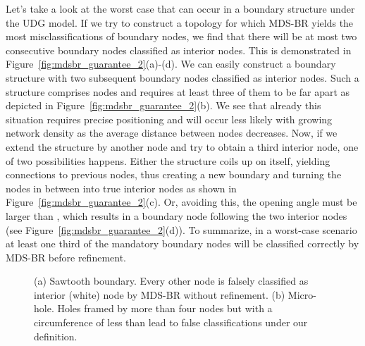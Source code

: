 \documentclass{llncs}
\begin{document}
Let's take a look at the worst case that can occur in a boundary structure under the UDG model.
If we try to construct a topology for which MDS-BR yields the most misclassifications of boundary nodes, we find that there will be at most two consecutive boundary nodes classified as interior nodes.
This is demonstrated in Figure~\ref{fig:mdsbr_guarantee_2}(a)-(d).
We can easily construct a boundary structure with two subsequent boundary nodes classified as interior nodes.
Such a structure comprises  nodes and requires at least three of them to be far apart as depicted in Figure~\ref{fig:mdsbr_guarantee_2}(b).
We see that already this situation requires precise positioning and will occur less likely with growing network density as the average distance between nodes decreases.
Now, if we extend the structure by another node and try to obtain a third interior node, one of two possibilities happens.
Either the structure coils up on itself, yielding connections to previous nodes, thus creating a new boundary and turning the nodes in between into true interior nodes as shown in Figure~\ref{fig:mdsbr_guarantee_2}(c).
Or, avoiding this, the opening angle must be larger than , which results in a boundary node following the two interior nodes (see Figure~\ref{fig:mdsbr_guarantee_2}(d)).
To summarize, in a worst-case scenario at least one third of the mandatory boundary nodes will be classified correctly by MDS-BR before refinement.


\begin{figure}[t]
\centering
\hfill
{}
\hfill
{}
\hfill{}
\caption{(a) Sawtooth boundary. Every other node is falsely classified as interior (white) node by MDS-BR without refinement. (b) Micro-hole. Holes framed by more than four nodes but with a circumference of less than  lead to false classifications under our definition.}
\label{fig:mdsbr_guarantee_1}
\end{figure}
\end{document}

